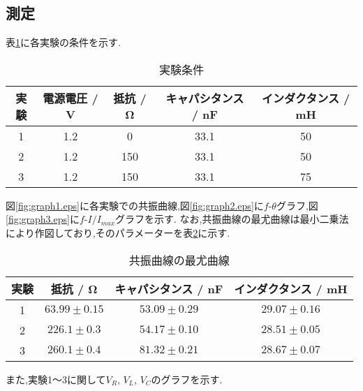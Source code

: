 \subsection{測定}
表\ref{tab:condition}に各実験の条件を示す.
\begin{table}[h]
   \caption{実験条件}
   \label{tab:condition}
   \centering
   \begin{tabular}{c|cccc}
     \hline
     実験&電源電圧 / \si{\volt}&抵抗 / \si{\ohm}&キャパシタンス / \si{\nano\farad}&インダクタンス / \si{\milli\henry}\\
     \hline \hline
     1&1.2&0&33.1&50\\
     2&1.2&150&33.1&50\\
     3&1.2&150&33.1&75\\
     \hline
   \end{tabular}
\end{table}
図\ref{fig:graph1.eps}に各実験での共振曲線,図\ref{fig:graph2.eps}に$f$-$\theta$グラフ,図\ref{fig:graph3.eps}に$f$-$I/I_{max}$グラフを示す.
なお,共振曲線の最尤曲線は最小二乗法により作図しており,そのパラメーターを表\ref{tab:saiyu}に示す.
\begin{table}[htbp]
   \caption{共振曲線の最尤曲線}
   \label{tab:saiyu}
   \centering
   \begin{tabular}{c|ccc}
     \hline
     実験&抵抗 / \si{\ohm}&キャパシタンス / \si{\nano\farad}&インダクタンス / \si{\milli\henry}\\
     \hline \hline
     1 & $63.99\pm{0.15}$ & $53.09\pm{0.29}$ & $29.07\pm{0.16}$ \\
     2 & $226.1\pm{0.3}$ & $54.17\pm{0.10}$ & $28.51\pm{0.05}$ \\
     3 & $260.1\pm{0.4}$ & $81.32\pm{0.21}$ & $28.67\pm{0.07}$ \\
     \hline
   \end{tabular}
\end{table}
また,実験1〜3に関して$V_R$, $V_L$, $V_C$のグラフを示す.
\begin{figure}[htbp]
  \begin{minipage}{0.5\hsize}
  \end{minipage}
  \begin{minipage}{0.5\hsize}
  \end{minipage} 
\end{figure}
